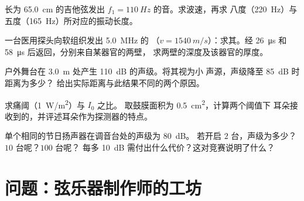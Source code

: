 \begin{exercise}[$\star\star$]\label{exo:g12:sound-acoustics:11}
长为 \qty{65.0}{cm} 的吉他弦发出
$f_1 = \qty{110}{Hz}$ 的音。求波速，再求
八度（\qty{220}{Hz}）与五度（\qty{165}{Hz}）所对应的振动长度。
\end{exercise}

\begin{exercise}[$\star\star\star$]\label{exo:g12:sound-acoustics:12}
一台医用探头向软组织发出 \qty{5.0}{MHz} 的
（$v = \qty{1540}{m/s}$）：求其。经
\qty{26}{\micro s} 和 \qty{58}{\micro s} 后返回，分别来自某器官的两壁，
求两壁的深度及该器官的厚度。
\end{exercise}

\begin{exercise}[$\star\star\star$]\label{exo:g12:sound-acoustics:13}
户外舞台在 \qty{3.0}{m} 处产生 \qty{110}{dB} 的声级。将其视为小
声源，声级降至 \qty{85}{dB} 时距离为多少？
给出实际距离与此结果不同的两个原因。
\end{exercise}

\begin{exercise}[$\star\star\star$]\label{exo:g12:sound-acoustics:14}
求痛阈（\qty{1}{W/m^2}）与 $I_0$ 之比。
取鼓膜面积为 \qty{0.5}{cm^2}，计算两个阈值下
耳朵接收到的，并评述耳朵作为探测器的特点。
\end{exercise}

\begin{exercise}[$\star\star\star$]\label{exo:g12:sound-acoustics:15}
单个相同的节日扬声器在调音台处的声级为 \qty{80}{dB}。
若开启 $2$ 台，声级为多少？$10$ 台呢？$100$ 台呢？
每多 \qty{+10}{dB} 需付出什么代价？这对竞赛说明了什么？
\end{exercise}

\section{问题：弦乐器制作师的工坊}

